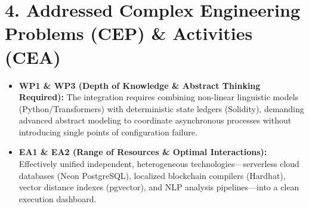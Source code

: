 \section{4. Addressed Complex Engineering Problems (CEP) \& Activities (CEA)}
\begin{itemize}
    \item \textbf{WP1 \& WP3 (Depth of Knowledge \& Abstract Thinking Required):} The integration requires combining non-linear linguistic models (Python/Transformers) with deterministic state ledgers (Solidity), demanding advanced abstract modeling to coordinate asynchronous processes without introducing single points of configuration failure.
    \item \textbf{EA1 \& EA2 (Range of Resources \& Optimal Interactions):} Effectively unified independent, heterogeneous technologies—serverless cloud databases (Neon PostgreSQL), localized blockchain compilers (Hardhat), vector distance indexes (pgvector), and NLP analysis pipelines—into a clean execution dashboard.
\end{itemize}

\newpage

